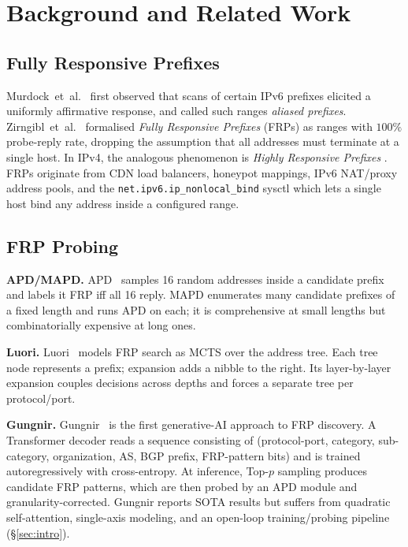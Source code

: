 \documentclass[conference]{IEEEtran}
\begin{document}
\section{Background and Related Work}\label{sec:related}

\subsection{Fully Responsive Prefixes}
Murdock~et~al.~\cite{murdock2017target} first observed that scans of
certain IPv6 prefixes elicited a uniformly affirmative response, and
called such ranges \emph{aliased prefixes}.  Zirngibl~et~al.\
\cite{zirngibl2022rusty} formalised \emph{Fully Responsive Prefixes}
(FRPs) as ranges with $100\%$ probe-reply rate, dropping the assumption
that all addresses must terminate at a single host.  In IPv4, the
analogous phenomenon is \emph{Highly Responsive Prefixes}
\cite{sattler2023packed}.  FRPs originate from CDN load balancers,
honeypot mappings, IPv6 NAT/proxy address pools, and the
\texttt{net.ipv6.ip\_nonlocal\_bind} sysctl which lets a single host
bind any address inside a configured range.

\subsection{FRP Probing}
\textbf{APD/MAPD.}  APD~\cite{gasser2018clusters} samples 16 random
addresses inside a candidate prefix and labels it FRP iff all 16 reply.
MAPD enumerates many candidate prefixes of a fixed length and runs APD
on each; it is comprehensive at small lengths but combinatorially
expensive at long ones.

\textbf{Luori.}  Luori~\cite{luori2024} models FRP search as MCTS over
the address tree.  Each tree node represents a prefix; expansion adds a
nibble to the right.  Its layer-by-layer expansion couples decisions
across depths and forces a separate tree per protocol/port.

\textbf{Gungnir.}  Gungnir~\cite{gungnir2025} is the first
generative-AI approach to FRP discovery.  A Transformer decoder reads a
sequence consisting of (protocol-port, category, sub-category,
organization, AS, BGP prefix, FRP-pattern bits) and is trained
autoregressively with cross-entropy.  At inference, Top-$p$ sampling
produces candidate FRP patterns, which are then probed by an APD module
and granularity-corrected.  Gungnir reports SOTA results but suffers
from quadratic self-attention, single-axis modeling, and an open-loop
training/probing pipeline (\S\ref{sec:intro}).
\end{document}
